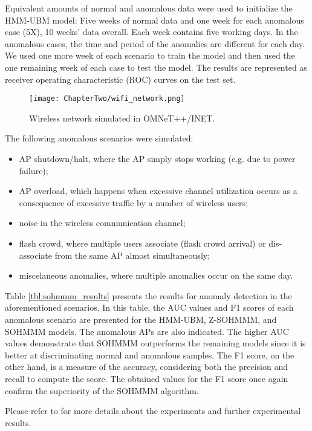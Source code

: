 Equivalent amounts of normal and anomalous data were used to initialize the HMM-UBM model: Five weeks of normal data and one week for each anomalous case (5X), 10 weeks' data overall. Each week contains five working days. In the anomalous cases, the time and period of the anomalies are different for each day. We used one more week of each scenario to train the model and then used the one remaining week of each case to test the model. The results are represented as receiver operating characteristic (ROC) curves on the test set.

\begin{figure}[h]
	\centering
	\texttt{[image: ChapterTwo/wifi\_network.png]}
	\caption{Wireless network simulated in OMNeT++/INET.}
	\label{fig:sohmmm_wifi_network}      
\end{figure}

The following anomalous scenarios were simulated:
\begin{itemize}
	\item AP shutdown/halt, where the AP simply stops working (e.g. due to power failure);
	\item AP overload, which happens when excessive channel utilization occurs as a consequence of excessive traffic by a number of wireless users;
	\item noise in the wireless communication channel;
	\item flash crowd, where multiple users associate (flash crowd arrival) or dis-associate from the same AP almost simultaneously;
	\item miscelaneous anomalies, where multiple anomalies occur on the same day.
\end{itemize}

Table \ref{tbl:sohmmm_results} presents the results for anomaly detection in the aforementioned scenarios. In this table, the AUC values and F1 scores of each anomalous scenario are presented for the HMM-UBM, Z-SOHMMM, and SOHMMM models. The anomalous APs are also indicated. The higher AUC values demonstrate that SOHMMM outperforms the remaining models since it is better at discriminating normal and anomalous samples. The F1 score, on the other hand, is a measure of the accuracy, considering both the precision and recall to compute the score. The obtained values for the F1 score once again confirm the superiority of the SOHMMM algorithm.

Please refer to \citet{SOHMMM} for more details about the experiments and further experimental results.

